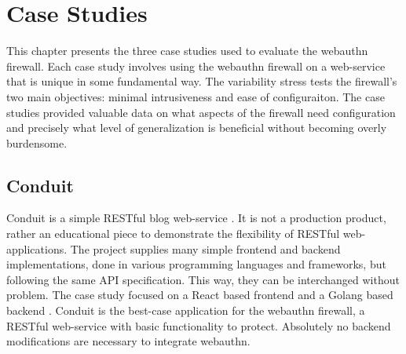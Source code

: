 

\chapter{Case Studies}

This chapter presents the three case studies used to evaluate the webauthn firewall. Each case study involves using the webauthn firewall on a web-service that is unique in some fundamental way. The variability stress tests the firewall's two main objectives: minimal intrusiveness and ease of configuraiton. The case studies provided valuable data on what aspects of the firewall need configuration and precisely what level of generalization is beneficial without becoming overly burdensome.

\section{Conduit}

Conduit is a simple RESTful blog web-service \cite{TODO-conduit}. It is not a production product, rather an educational piece to demonstrate the flexibility of RESTful web-applications. The project supplies many simple frontend and backend implementations, done in various programming languages and frameworks, but following the same API specification. This way, they can be interchanged without problem. The case study focused on a React based frontend \cite{TODO-Conduit-React-Frontend} and a Golang based backend \cite{TODO-Conduit-Go-Backend}. Conduit is the best-case application for the webauthn firewall, a RESTful web-service with basic functionality to protect. Absolutely no backend modifications are necessary to integrate webauthn.


